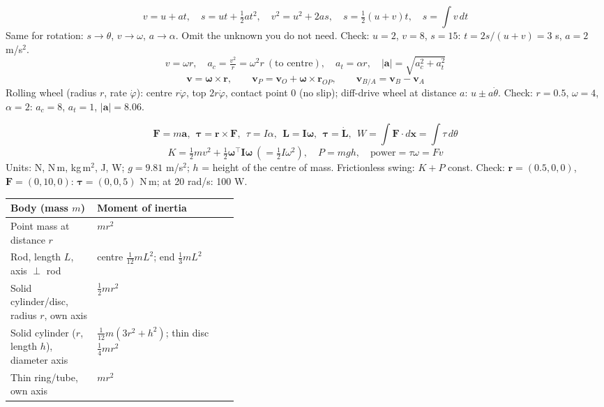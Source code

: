 \begin{multicols}{3}
\nopagebreak[4]
\begin{fbx}
\[v=u+at,\quad s=ut+\tfrac12at^2,\quad v^2=u^2+2as,\quad s=\tfrac12(u+v)t,\quad s=\textstyle\int v\,dt\]
Same for rotation: $s\to\theta$, $v\to\omega$, $a\to\alpha$. Omit the unknown you do not need. Check: $u=2$, $v=8$, $s=15$: $t=2s/(u+v)=3$ s, $a=2$ m/s$^2$. \chk
\[v=\omega r,\quad a_c=\tfrac{v^2}r=\omega^2r\ (\text{to centre}),\quad a_t=\alpha r,\quad|\mathbf a|=\sqrt{a_c^2+a_t^2}\]
\[\mathbf v=\boldsymbol\omega\times\mathbf r,\qquad\mathbf v_P=\mathbf v_O+\boldsymbol\omega\times\mathbf r_{OP},\qquad\mathbf v_{B/A}=\mathbf v_B-\mathbf v_A\]
Rolling wheel (radius $r$, rate $\dot\varphi$): centre $r\dot\varphi$, top $2r\dot\varphi$, contact point $0$ (no slip); diff-drive wheel at distance $a$: $u\pm a\dot\theta$. Check: $r=0.5$, $\omega=4$, $\alpha=2$: $a_c=8$, $a_t=1$, $|\mathbf a|=8.06$. \chk
\end{fbx}
\begin{fbx}
\[\mathbf F=m\mathbf a,\ \ \boldsymbol\tau=\mathbf r\times\mathbf F,\ \ \tau=I\alpha,\ \ \mathbf L=\mathbf I\boldsymbol\omega,\ \ \boldsymbol\tau=\dot{\mathbf L},\ \ W=\textstyle\int\mathbf F\!\cdot\!d\mathbf x=\int\tau\,d\theta\]
\[K=\tfrac12mv^2+\tfrac12\boldsymbol\omega^\top\mathbf I\boldsymbol\omega\ (=\tfrac12I\omega^2),\quad P=mgh,\quad\text{power}=\tau\omega=Fv\]
Units: N, N\,m, kg\,m$^2$, J, W; $g=9.81$ m/s$^2$; $h$ = height of the centre of mass. Frictionless swing: $K+P$ const. Check: $\mathbf r=(0.5,0,0)$, $\mathbf F=(0,10,0)$: $\boldsymbol\tau=(0,0,5)$ N\,m; at 20 rad/s: 100 W. \chk
\end{fbx}
\begin{fbx}
\begin{tabularx}{\linewidth}{@{}>{\raggedright\arraybackslash}p{0.38\linewidth}X@{}}\toprule
Body (mass $m$) & Moment of inertia\\\midrule
Point mass at distance $r$ & $mr^2$\\
Rod, length $L$, axis $\perp$ rod & centre $\tfrac1{12}mL^2$; end $\tfrac13mL^2$\\
Solid cylinder/disc, radius $r$, own axis & $\tfrac12mr^2$\\
Solid cylinder ($r$, length $h$), diameter axis & $\tfrac1{12}m(3r^2+h^2)$; thin disc $\tfrac14mr^2$\\
Thin ring/tube, own axis & $mr^2$\\

\end{tabularx}
\end{fbx}
\end{multicols}
